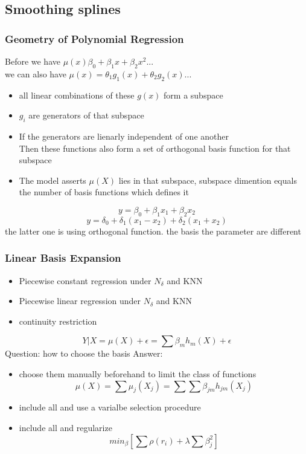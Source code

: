 \documentclass[10pt]{article}
\theoremstyle{break}
\begin{document}
    \subsection{Smoothing splines}
        \subsubsection{Geometry of Polynomial Regression}
            Before we have $\mu(x)\beta_0+\beta_1x+\beta_2x^2...$\\
            we can also have $\mu(x)=\theta_1g_1(x)+\theta_2g_2(x)...$
            \begin{itemize}
                \item all linear combinations of these $g(x)$ form a subspace
                \item $g_i$ are generators of that subspace 
                \item If the generators are lienarly independent of one another
                \\Then these functions also form a set of orthogonal basis function for that subspace 
                \item The model asserts $\mu(X)$ lies in that subspace, subspace dimention equals the number of basis functions which defines it 
                
            \end{itemize}
            $$y=\beta_0+\beta_1x_1+\beta_2x_2$$$$y=\delta_0+\delta_1(x_1-x_2)+\delta_2(x_1+x_2)$$
            the latter one is using orthogonal function. the basis the parameter are different
        \subsubsection{Linear Basis Expansion}
        \begin{itemize}
            \item Piecewise constant regression under $N_\delta$ and KNN 
            \item Piecewise linear regression under $N_\delta$ and KNN 
            \item continuity restriction
        \end{itemize}
        $$Y|X=\mu(X)+\epsilon=\sum \beta_mh_m(X)+\epsilon$$
        Question: how to choose the basis 
        Answer:\begin{itemize}
            \item choose them manually beforehand to limit the class of functions 
                $$\mu(X)=\sum\mu_j(X_j)=\sum\sum\beta_{jm}h_{jm}(X_j)$$
            \item include all and use a varialbe selection procedure
            \item include all and regularize 
            $$min_\beta [\sum\rho(r_i)+\lambda\sum\beta_j^2]$$
        \end{itemize}
\end{document}
